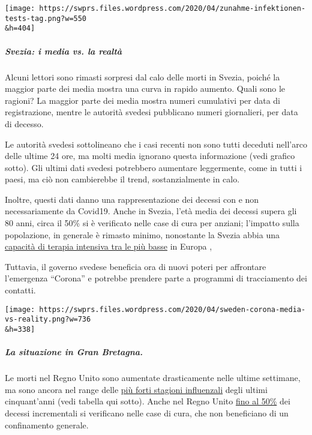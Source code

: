 \texttt{[image: https://swprs.files.wordpress.com/2020/04/zunahme-infektionen-tests-tag.png?w=550\\\&h=404]}

\hypertarget{svezia-i-media-vs-la-realtuxe0}{%
\subparagraph{\texorpdfstring{\textbf{Svezia: i media vs. la
realtà}}{Svezia: i media vs. la realtà}}\label{svezia-i-media-vs-la-realtuxe0}}

Alcuni lettori sono rimasti sorpresi dal calo delle morti in Svezia,
poiché la maggior parte dei media mostra una curva in rapido aumento.
Quali sono le ragioni? La maggior parte dei media mostra numeri
cumulativi per data di registrazione, mentre le autorità svedesi
pubblicano numeri giornalieri, per data di decesso.

Le autorità svedesi sottolineano che i casi recenti non sono tutti
deceduti nell'arco delle ultime 24 ore, ma molti media ignorano questa
informazione (vedi grafico sotto). Gli ultimi dati svedesi potrebbero
aumentare leggermente, come in tutti i paesi, ma ciò non cambierebbe il
trend, sostanzialmente in calo.

Inoltre, questi dati danno una rappresentazione dei decessi con e non
necessariamente da Covid19. Anche in Svezia, l'età media dei decessi
supera gli 80 anni, circa il 50\% si è verificato nelle case di cura per
anziani; l'impatto sulla popolazione, in generale è rimasto minimo,
nonostante la Svezia abbia una
\href{https://link.springer.com/article/10.1007/s00134-012-2627-8}{capacità
di terapia intensiva tra le più basse} in Europa ,

Tuttavia, il governo svedese beneficia ora di nuovi poteri per
affrontare l'emergenza ``Corona'' e potrebbe prendere parte a programmi
di tracciamento dei contatti.

\texttt{[image: https://swprs.files.wordpress.com/2020/04/sweden-corona-media-vs-reality.png?w=736\\\&h=338]}

\hypertarget{la-situazione-in-gran-bretagna}{%
\subparagraph{\texorpdfstring{\textbf{La situazione in Gran
Bretagna.}}{La situazione in Gran Bretagna.}}\label{la-situazione-in-gran-bretagna}}

Le morti nel Regno Unito sono aumentate drasticamente nelle ultime
settimane, ma sono ancora nel range delle
\href{http://inproportion2.talkigy.com/}{più forti stagioni influenzali}
degli ultimi cinquant'anni (vedi tabella qui sotto). Anche nel Regno
Unito
\href{https://ltccovid.org/2020/04/12/mortality-associated-with-covid-19-outbreaks-in-care-homes-early-international-evidence/}{fino
al 50\%} dei decessi incrementali si verificano nelle case di cura, che
non beneficiano di un confinamento generale.

